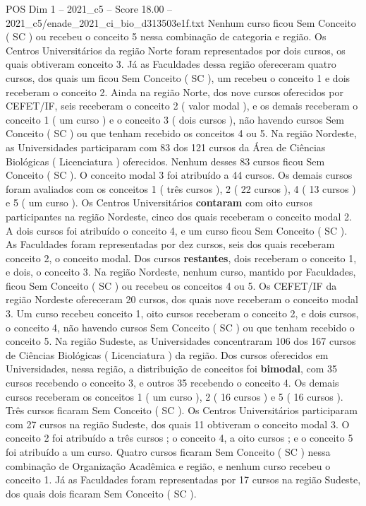 \begin{textsample}{POS Dim 1 – 2021\_c5 – Score 18.00 – 2021\_c5/enade\_2021\_ci\_bio\_d313503e1f.txt}
Nenhum curso ficou Sem Conceito ( SC ) ou recebeu o conceito 5 nessa combinação de categoria e região.
Os Centros Universitários da região Norte foram representados por dois cursos, os quais obtiveram conceito 3.
Já as Faculdades dessa região ofereceram quatro cursos, dos quais um ficou Sem Conceito ( SC ), um recebeu o conceito 1 e dois receberam o conceito 2.
Ainda na região Norte, dos nove cursos oferecidos por CEFET/IF, seis receberam o conceito 2 ( valor modal ), e os demais receberam o conceito 1 ( um curso ) e o conceito 3 ( dois cursos ), não havendo cursos Sem Conceito ( SC ) ou que tenham recebido os conceitos 4 ou 5.
Na região Nordeste, as Universidades participaram com 83 dos 121 cursos da Área de Ciências Biológicas ( Licenciatura ) oferecidos.
Nenhum desses 83 cursos ficou Sem Conceito ( SC ).
O conceito modal 3 foi atribuído a 44 cursos.
Os demais cursos foram avaliados com os conceitos 1 ( três cursos ), 2 ( 22 cursos ), 4 ( 13 cursos ) e 5 ( um curso ).
Os Centros Universitários \textbf{contaram} com oito cursos participantes na região Nordeste, cinco dos quais receberam o conceito modal 2.
A dois cursos foi atribuído o conceito 4, e um curso ficou Sem Conceito ( SC ).
As Faculdades foram representadas por dez cursos, seis dos quais receberam conceito 2, o conceito modal.
Dos cursos \textbf{restantes}, dois receberam o conceito 1, e dois, o conceito 3.
Na região Nordeste, nenhum curso, mantido por Faculdades, ficou Sem Conceito ( SC ) ou recebeu os conceitos 4 ou 5.
Os CEFET/IF da região Nordeste ofereceram 20 cursos, dos quais nove receberam o conceito modal 3.
Um curso recebeu conceito 1, oito cursos receberam o conceito 2, e dois cursos, o conceito 4, não havendo cursos Sem Conceito ( SC ) ou que tenham recebido o conceito 5.
Na região Sudeste, as Universidades concentraram 106 dos 167 cursos de Ciências Biológicas ( Licenciatura ) da região.
Dos cursos oferecidos em Universidades, nessa região, a distribuição de conceitos foi \textbf{bimodal}, com 35 cursos recebendo o conceito 3, e outros 35 recebendo o conceito 4.
Os demais cursos receberam os conceitos 1 ( um curso ), 2 ( 16 cursos ) e 5 ( 16 cursos ).
Três cursos ficaram Sem Conceito ( SC ).
Os Centros Universitários participaram com 27 cursos na região Sudeste, dos quais 11 obtiveram o conceito modal 3.
O conceito 2 foi atribuído a três cursos ; o conceito 4, a oito cursos ; e o conceito 5 foi atribuído a um curso.
Quatro cursos ficaram Sem Conceito ( SC ) nessa combinação de Organização Acadêmica e região, e nenhum curso recebeu o conceito 1.
Já as Faculdades foram representadas por 17 cursos na região Sudeste, dos quais dois ficaram Sem Conceito ( SC ).

\end{textsample}
